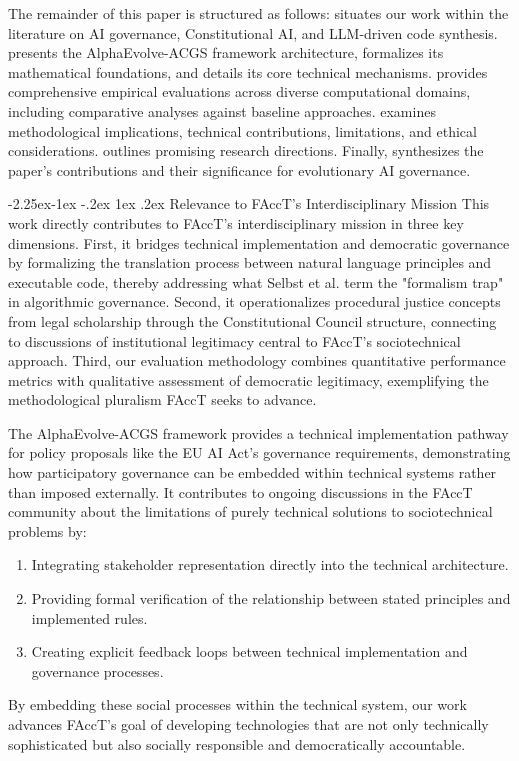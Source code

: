 \documentclass[manuscript,screen,9pt]{acmart}
\makeatletter
\renewcommand\subsection{\@startsection{subsection}{2}{\z@}%
  {-2.25ex\@plus -1ex \@minus -.2ex}%
  {1ex \@plus .2ex}%
  {\normalfont\large\bfseries}}
\makeatother
\begin{document}
The remainder of this paper is structured as follows:  situates our work within the literature on AI governance, Constitutional AI, and LLM-driven code synthesis.  presents the AlphaEvolve-ACGS framework architecture, formalizes its mathematical foundations, and details its core technical mechanisms.  provides comprehensive empirical evaluations across diverse computational domains, including comparative analyses against baseline approaches.  examines methodological implications, technical contributions, limitations, and ethical considerations.  outlines promising research directions. Finally,  synthesizes the paper's contributions and their significance for evolutionary AI governance.

\subsection{Relevance to FAccT's Interdisciplinary Mission}
\label{subsec:facct_relevance}
This work directly contributes to FAccT's interdisciplinary mission in three key dimensions. First, it bridges technical implementation and democratic governance by formalizing the translation process between natural language principles and executable code, thereby addressing what Selbst et al. \cite{Selbst2019FairnessAccountability} term the "formalism trap" in algorithmic governance. Second, it operationalizes procedural justice concepts from legal scholarship through the Constitutional Council structure, connecting to discussions of institutional legitimacy central to FAccT's sociotechnical approach. Third, our evaluation methodology combines quantitative performance metrics with qualitative assessment of democratic legitimacy, exemplifying the methodological pluralism FAccT seeks to advance.

The AlphaEvolve-ACGS framework provides a technical implementation pathway for policy proposals like the EU AI Act's governance requirements, demonstrating how participatory governance can be embedded within technical systems rather than imposed externally. It contributes to ongoing discussions in the FAccT community about the limitations of purely technical solutions to sociotechnical problems by:
\begin{enumerate}[leftmargin=*,itemsep=1pt,parsep=1pt]
    \item Integrating stakeholder representation directly into the technical architecture.
    \item Providing formal verification of the relationship between stated principles and implemented rules.
    \item Creating explicit feedback loops between technical implementation and governance processes.
\end{enumerate}
By embedding these social processes within the technical system, our work advances FAccT's goal of developing technologies that are not only technically sophisticated but also socially responsible and democratically accountable.
\end{document}

